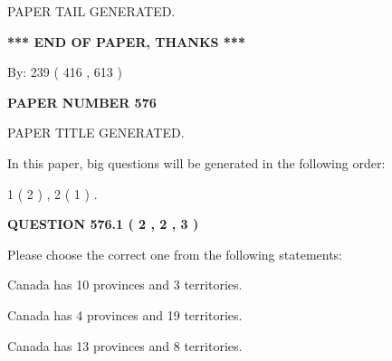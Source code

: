 \documentclass[12pt]{article}
\begin{document}
   
   
   
   
   
 \vspace{0.2in}
 
   
   
\vspace{2.0in} PAPER TAIL GENERATED.
   
   
   
   
\vspace{1.0in} 
{\textbf{\large{ *** END OF PAPER, THANKS *** }}} 
   
   
\hspace{1.0in} By: 
 239 ( 416 ,  613 )
   
   
   
   
\newpage 
\setcounter{page}{ 
   576001 } 
   
   
   
   
 {\textbf{ \Large{ PAPER NUMBER  576  }}}
   
   
\vspace{0.2in}
   
   
   
   
   
   
   
   
 \vspace{0.2in}
 
 
 
 
   
   
 PAPER TITLE GENERATED.
   
   
   
\vspace{0.2in}
   
In this paper, big questions will be generated in the following order: 
   
   
   1 ( 2 )
 ,
   2 ( 1 )
 .
  
\vspace{0.2in}
  
{\textbf{\Large{QUESTION
576.1 
 ( 2 , 2 , 3 )
}}}
  
  
Please choose the correct one from the following statements:
 
 
Canada has 10  provinces and 3 territories.
 
 
Canada has   4 provinces and  19 territories.
 
 
Canada has  13 provinces and  8 territories.
 
\end{document}
